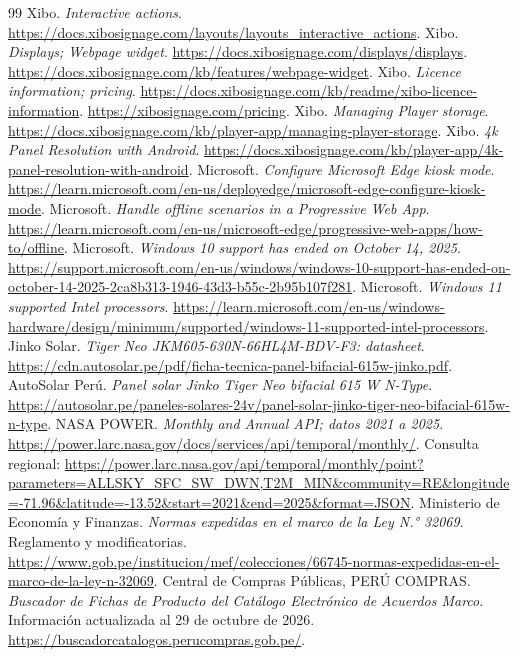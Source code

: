 \begin{thebibliography}{99}
 Xibo. \emph{Interactive actions}. \url{https://docs.xibosignage.com/layouts/layouts_interactive_actions}.
 Xibo. \emph{Displays; Webpage widget}. \url{https://docs.xibosignage.com/displays/displays}. \url{https://docs.xibosignage.com/kb/features/webpage-widget}.
 Xibo. \emph{Licence information; pricing}. \url{https://docs.xibosignage.com/kb/readme/xibo-licence-information}. \url{https://xibosignage.com/pricing}.
 Xibo. \emph{Managing Player storage}. \url{https://docs.xibosignage.com/kb/player-app/managing-player-storage}.
 Xibo. \emph{4k Panel Resolution with Android}. \url{https://docs.xibosignage.com/kb/player-app/4k-panel-resolution-with-android}.
 Microsoft. \emph{Configure Microsoft Edge kiosk mode}. \url{https://learn.microsoft.com/en-us/deployedge/microsoft-edge-configure-kiosk-mode}.
 Microsoft. \emph{Handle offline scenarios in a Progressive Web App}. \url{https://learn.microsoft.com/en-us/microsoft-edge/progressive-web-apps/how-to/offline}.
 Microsoft. \emph{Windows 10 support has ended on October 14, 2025}. \url{https://support.microsoft.com/en-us/windows/windows-10-support-has-ended-on-october-14-2025-2ca8b313-1946-43d3-b55c-2b95b107f281}.
 Microsoft. \emph{Windows 11 supported Intel processors}. \url{https://learn.microsoft.com/en-us/windows-hardware/design/minimum/supported/windows-11-supported-intel-processors}.
 Jinko Solar. \emph{Tiger Neo JKM605-630N-66HL4M-BDV-F3: datasheet}. \url{https://cdn.autosolar.pe/pdf/ficha-tecnica-panel-bifacial-615w-jinko.pdf}.
 AutoSolar Perú. \emph{Panel solar Jinko Tiger Neo bifacial 615 W N-Type}. \url{https://autosolar.pe/paneles-solares-24v/panel-solar-jinko-tiger-neo-bifacial-615w-n-type}.
 NASA POWER. \emph{Monthly and Annual API; datos 2021 a 2025}. \url{https://power.larc.nasa.gov/docs/services/api/temporal/monthly/}. Consulta regional: \url{https://power.larc.nasa.gov/api/temporal/monthly/point?parameters=ALLSKY_SFC_SW_DWN,T2M_MIN&community=RE&longitude=-71.96&latitude=-13.52&start=2021&end=2025&format=JSON}.
 Ministerio de Economía y Finanzas. \emph{Normas expedidas en el marco de la Ley N.° 32069}. Reglamento y modificatorias. \url{https://www.gob.pe/institucion/mef/colecciones/66745-normas-expedidas-en-el-marco-de-la-ley-n-32069}.
 Central de Compras Públicas, PERÚ COMPRAS. \emph{Buscador de Fichas de Producto del Catálogo Electrónico de Acuerdos Marco}. Información actualizada al 29 de octubre de 2026. \url{https://buscadorcatalogos.perucompras.gob.pe/}.

\end{thebibliography}

